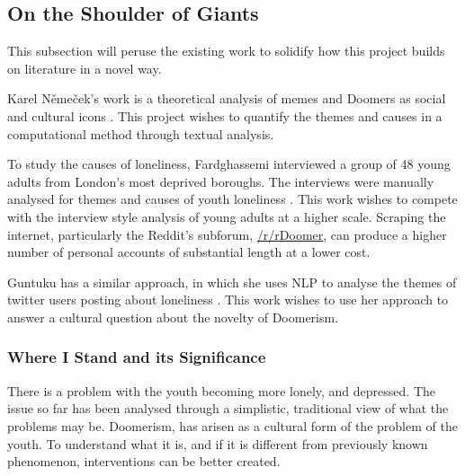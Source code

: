 \documentclass[../report.tex]{subfiles}
\begin{document}
\subsection{On the Shoulder of Giants}
This subsection will peruse the existing work to solidify how this project builds on literature in a novel way. 

Karel Němeček's work is a theoretical analysis of memes and Doomers as social and cultural icons \cite{memes_reservoir}.
This project wishes to quantify the themes and causes in a computational method through textual analysis.

To study the causes of loneliness, Fardghassemi interviewed a group of 48 young adults from London's most deprived boroughs. The interviews were manually analysed for themes and causes of youth loneliness \cite{fardghassemi_interviews}.
This work wishes to compete with the interview style analysis of young adults at a higher scale.
Scraping the internet, particularly the Reddit's subforum,
\href{www.reddit.com/r/Doomer}{/r/rDoomer},
can produce a higher number of personal accounts of substantial length at a lower cost.

Guntuku has a similar approach, in which she uses NLP to analyse the themes of twitter users posting about loneliness \cite{twitter_loneliness}.
This work wishes to use her approach to answer a cultural question about the novelty of Doomerism.

\subsubsection{Where I Stand and its Significance}
There is a problem with the youth becoming more lonely, and depressed. 
The issue so far has been analysed through a simplistic, traditional view of what the problems may be.
Doomerism, has arisen as a cultural form of the problem of the youth. 
To understand what it is, and if it is different from previously known phenomenon, interventions can be better created. 
\end{document}

